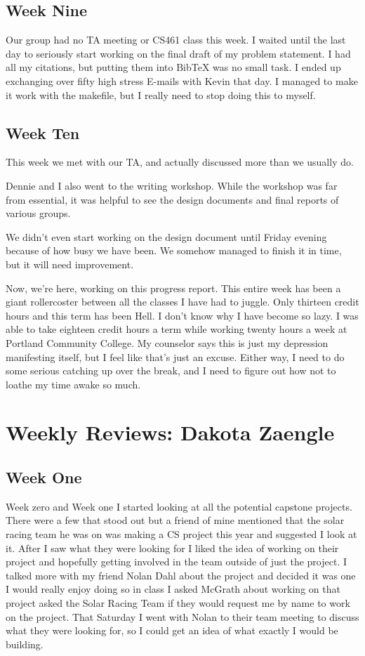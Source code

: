 \begin{singlespace}
\subsection{Week Nine}
Our group had no TA meeting or CS461 class this week.
I waited until the last day to seriously start working on the final draft of my problem statement.
I had all my citations, but putting them into BibTeX was no small task.
I ended up exchanging over fifty high stress E-mails with Kevin that day.
I managed to make it work with the makefile, but I really need to stop doing this to myself.

\subsection{Week Ten}
This week we met with our TA, and actually discussed more than we usually do.

Dennie and I also went to the writing workshop. While the workshop was far from essential, it was helpful to see the design documents and final reports of various groups.

We didn't even start working on the design document until Friday evening because of how busy we have been.
We somehow managed to finish it in time, but it will need improvement.

Now, we're here, working on this progress report.
This entire week has been a giant rollercoster between all the classes I have had to juggle.
Only thirteen credit hours and this term has been Hell.
I don't know why I have become so lazy.
I was able to take eighteen credit hours a term while working twenty hours a week at Portland Community College.
My counselor says this is just my depression manifesting itself, but I feel like that's just an excuse.
Either way, I need to do some serious catching up over the break, and I need to figure out how not to loathe my time awake so much.






\section{Weekly Reviews: Dakota Zaengle}
\subsection{Week One}
Week zero and Week one I started looking at all the potential capstone projects. 
There were a few that stood out but a friend of mine mentioned that the solar racing team he was on was making a CS project this year and suggested I look at it. 
After I saw what they were looking for I liked the idea of working on their project and hopefully getting involved in the team outside of just the project. 
I talked more with my friend Nolan Dahl about the project and decided it was one I would really enjoy doing so in class I asked McGrath about working on that project asked the Solar Racing Team if they would request me by name to work on the project. 
That Saturday I went with Nolan to their team meeting to discuss what they were looking for, so I could get an idea of what exactly I would be building.


\end{singlespace}
